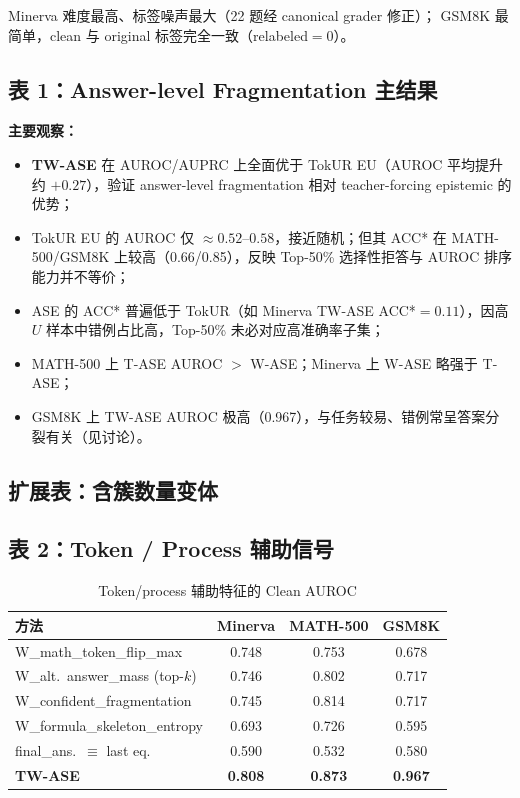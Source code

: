 \documentclass[11pt,a4paper]{article}
\begin{document}
Minerva 难度最高、标签噪声最大（22 题经 canonical grader 修正）；
GSM8K 最简单，clean 与 original 标签完全一致（relabeled$=0$）。

\subsection{表 1：Answer-level Fragmentation 主结果}



\textbf{主要观察：}
\begin{itemize}
  \item \textbf{TW-ASE} 在 AUROC/AUPRC 上全面优于 TokUR EU（AUROC 平均提升约 $+0.27$），验证 answer-level fragmentation 相对 teacher-forcing epistemic 的优势；
  \item TokUR EU 的 AUROC 仅 $\approx 0.52$--$0.58$，接近随机；但其 ACC* 在 MATH-500/GSM8K 上较高（0.66/0.85），反映 Top-50\% 选择性拒答与 AUROC 排序能力并不等价；
  \item ASE 的 ACC* 普遍低于 TokUR（如 Minerva TW-ASE ACC*$=0.11$），因高 $U$ 样本中错例占比高，Top-50\% 未必对应高准确率子集；
  \item MATH-500 上 T-ASE AUROC $>$ W-ASE；Minerva 上 W-ASE 略强于 T-ASE；
  \item GSM8K 上 TW-ASE AUROC 极高（0.967），与任务较易、错例常呈答案分裂有关（见讨论）。
\end{itemize}

\subsection{扩展表：含簇数量变体}



\subsection{表 2：Token / Process 辅助信号}

\begin{table}[h]
  \centering
  \caption{Token/process 辅助特征的 Clean AUROC}
  \label{tab:token}
  \begin{tabular}{lccc}
    \toprule
    方法 & Minerva & MATH-500 & GSM8K \\
    \midrule
    W\_math\_token\_flip\_max       & 0.748 & 0.753 & 0.678 \\
    W\_alt.\ answer\_mass (top-$k$) & 0.746 & 0.802 & 0.717 \\
    W\_confident\_fragmentation     & 0.745 & 0.814 & 0.717 \\
    W\_formula\_skeleton\_entropy   & 0.693 & 0.726 & 0.595 \\
    final\_ans.\ $\equiv$ last eq.  & 0.590 & 0.532 & 0.580 \\
    \midrule
    \textbf{TW-ASE}                 & \textbf{0.808} & \textbf{0.873} & \textbf{0.967} \\
    \bottomrule
  \end{tabular}
\end{table}
\end{document}
